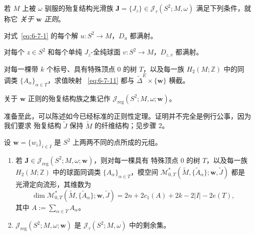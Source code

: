 \begin{definition}\label{def:6-7-10}
若 $M$ 上被 $\omega$ 驯服的殆复结构光滑族
$\mathbf J=\{J_z\}\in\mathcal J_\tau(S^2;M,\omega)$ 满足下列条件，就称它
\emph{关于 $\mathbf w$ 正则}。
\begin{description}[leftmargin=3.4em,style=nextline]
\item[\textup{(H)}] 对式~\eqref{eq:6-7-1} 的每个解 $u:S^2\to M$，$D_u$ 都满射。
\item[\textup{(V)}] 对每个 $z\in S^2$ 和每个单纯 $J_z$-全纯球面
$v:S^2\to M$，$D_{z,v}$ 都满射。
\item[\textup{(E)}] 对每一棵带 $k$ 个标号、具有特殊顶点 $0$ 的树 $T$，以及每一族
$H_2(M;\mathbb Z)$ 中的同调类 $\{A_\alpha\}_{\alpha\in T}$，求值映射
~\eqref{eq:6-7-11} 都与 $\widetilde\Delta^E\times\{\mathbf w\}$ 横截。
\end{description}
关于 $\mathbf w$ 正则的殆复结构族之集记作
$\mathcal J_{\mathrm{reg}}(S^2;M,\omega;\mathbf w)$。
\end{definition}

准备至此，可以陈述如今已经标准的正则性定理。证明并不完全是例行公事，因为我们要求
殆复结构 $\widetilde J$ 保持 $\widetilde M$ 的纤维结构；见步骤 2。

\begin{theorem}\label{thm:6-7-11}
设 $\mathbf w=\{w_i\}_{i\in I}$ 是 $S^2$ 上两两不同的点所成的元组。
\begin{enumerate}[label=\textup{(\roman*)},leftmargin=3em]
\item 若 $\mathbf J\in\mathcal J_{\mathrm{reg}}(S^2;M,\omega;\mathbf w)$，则对每一棵具有
特殊顶点 $0$ 的树 $T$，以及每一族 $H_2(M;\mathbb Z)$ 中的球面同调类
$\{A_\alpha\}_{\alpha\in T}$，模空间
$\mathcal M^*_{0,T}
(\widetilde M,\{\widetilde A_\alpha\};\mathbf w,\widetilde J)$ 都是光滑定向流形，其维数为
\[
  \dim\mathcal M^*_{0,T}
  (\widetilde M,\{\widetilde A_\alpha\};\mathbf w,\widetilde J)
  =2n+2c_1(A)+2k-2|I|-2e(T),
\]
其中 $A:=\sum_{\alpha\in T}A_\alpha$。
\item $\mathcal J_{\mathrm{reg}}(S^2;M,\omega;\mathbf w)$ 是
$\mathcal J_\tau(S^2;M,\omega)$ 中的剩余集。
\end{enumerate}
\end{theorem}

